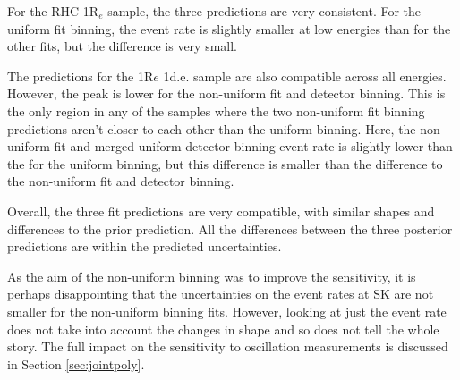 For the RHC 1R$_e$ sample, the three predictions are very consistent. For the uniform fit binning, the event rate is slightly smaller at low energies than for the other fits, but the difference is very small.

The predictions for the 1R$e$ 1d.e. sample are also compatible across all energies. However, the peak is lower for the non-uniform fit and detector binning. This is the only region in any of the samples where the two non-uniform fit binning predictions aren't closer to each other than the uniform binning. Here, the non-uniform fit and merged-uniform detector binning event rate is slightly lower than the for the uniform binning, but this difference is smaller than the difference to the non-uniform fit and detector binning. 

Overall, the three fit predictions are very compatible, with similar shapes and differences to the prior prediction. All the differences between the three posterior predictions are within the predicted uncertainties.

As the aim of the non-uniform binning was to improve the sensitivity, it is perhaps disappointing that the uncertainties on the event rates at SK are not smaller for the non-uniform binning fits. However, looking at just the event rate does not take into account the changes in shape and so does not tell the whole story. The full impact on the sensitivity to oscillation measurements is discussed in Section \ref{sec:jointpoly}.

